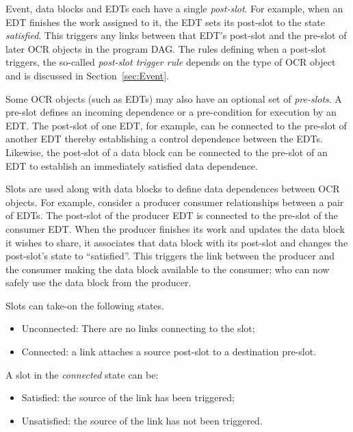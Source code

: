 Event, data blocks and EDTs each have a
single \emph{post-slot}.
For example, when an EDT finishes the work
assigned to it, the EDT sets its post-slot to the state \emph{satisfied}.
This triggers any links between that EDT's post-slot and the pre-slot of later OCR
objects in the program DAG.  The rules
defining when a post-slot triggers, the so-called \emph{post-slot
trigger rule} depends on the type of OCR
object and is discussed in Section~\ref{sec:Event}.

Some OCR objects (such as EDTs) may also have an optional set of
\emph{pre-slots}. A pre-slot defines an incoming
dependence or a pre-condition for execution by an EDT. The post-slot
of one EDT, for example, can be connected to the pre-slot of another
EDT thereby establishing a control dependence between the EDTs. Likewise,
the post-slot of a data block can be connected to the pre-slot of an EDT
to establish an immediately satisfied data dependence.

Slots are used along with data blocks to define data
dependences between OCR objects. For example,
consider a producer consumer relationships between a pair of EDTs.  The post-slot of the producer EDT is connected to
the pre-slot of the consumer EDT. When the producer finishes its work
and updates the data block it wishes to share, it associates that data
block with its post-slot and changes the post-slot's state to ``satisfied''.  This triggers
the link between the producer and the consumer making the data block
available to the consumer; who can now safely use the data block from
the producer.

Slots can take-on the following states.
\begin{itemize}
\item Unconnected: There are no links connecting to the slot;
\item Connected: a link attaches a source post-slot to a destination pre-slot.
\end{itemize}
A slot in the \emph{connected} state can be:
\begin{itemize}
\item Satisfied: the source of the link has been triggered;
\item Unsatisfied: the source of the link has not been triggered.
\end{itemize}

